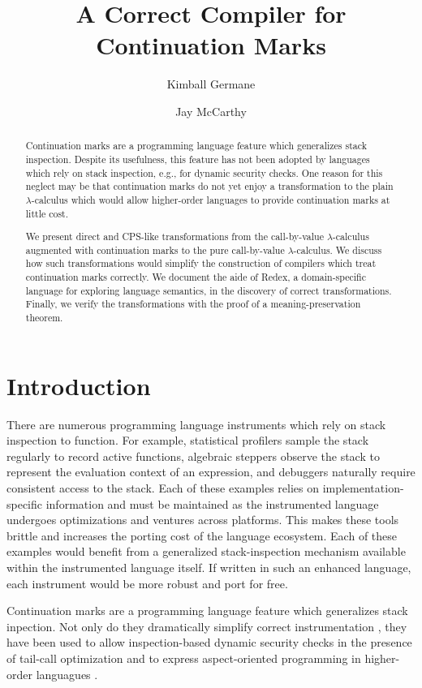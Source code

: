 \documentclass{llncs}
\title{A Correct Compiler for Continuation Marks}
\author{Kimball Germane \and Jay McCarthy}
\institute{Brigham Young University}
\begin{document}
\maketitle

\begin{abstract}
Continuation marks are a programming language feature which generalizes stack inspection. Despite its usefulness, this feature has not been adopted by languages which rely on stack inspection, e.g., for dynamic security checks. One reason for this neglect may be that continuation marks do not yet enjoy a transformation to the plain $\lambda$-calculus which would allow higher-order languages to provide continuation marks at little cost.

We present direct and CPS-like transformations from the call-by-value $\lambda$-calculus augmented with continuation marks to the pure call-by-value $\lambda$-calculus. We discuss how such transformations would simplify the construction of compilers which treat continuation marks correctly. We document the aide of Redex, a domain-specific language for exploring language semantics, in the discovery of correct transformations. Finally, we verify the transformations with the proof of a meaning-preservation theorem.
\end{abstract}

\section{Introduction}

There are numerous programming language instruments which rely on stack inspection to function. For example, statistical profilers sample the stack regularly to record active functions, algebraic steppers observe the stack to represent the evaluation context of an expression, and debuggers naturally require consistent access to the stack. Each of these examples relies on implementation-specific information and must be maintained as the instrumented language undergoes optimizations and ventures across platforms. This makes these tools brittle and increases the porting cost of the language ecosystem. Each of these examples would benefit from a generalized stack-inspection mechanism available within the instrumented language itself. If written in such an enhanced language, each instrument would be more robust and port for free.

Continuation marks \cite{clements2006portable} are a programming language feature which generalizes stack inpection. Not only do they dramatically simplify correct instrumentation \cite{clements2001modeling}, they have been used to allow inspection-based dynamic security checks in the presence of tail-call optimization \cite{clements2004tail} and to express aspect-oriented programming in higher-order languagues \cite{tucker2003pointcuts}.
\end{document}
